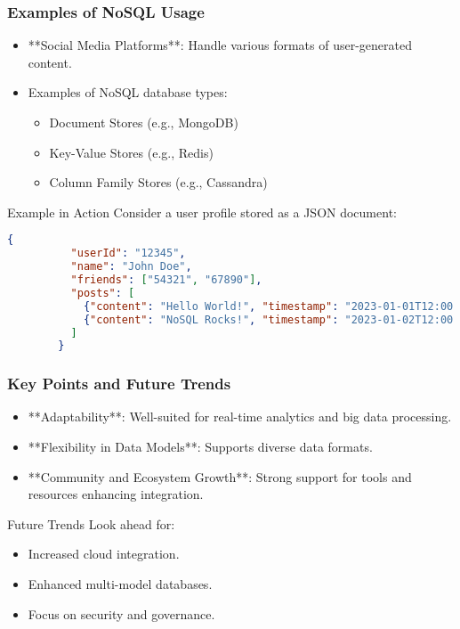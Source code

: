 \documentclass[aspectratio=169]{beamer}
\begin{document}
\begin{frame}[fragile]
    \frametitle{Examples of NoSQL Usage}
    \begin{itemize}
        \item **Social Media Platforms**: Handle various formats of user-generated content.
        \item Examples of NoSQL database types:
        \begin{itemize}
            \item Document Stores (e.g., MongoDB)
            \item Key-Value Stores (e.g., Redis)
            \item Column Family Stores (e.g., Cassandra)
        \end{itemize}
    \end{itemize}
    
    \begin{block}{Example in Action}
        Consider a user profile stored as a JSON document:
        \begin{lstlisting}[language=json]
        {
          "userId": "12345",
          "name": "John Doe",
          "friends": ["54321", "67890"],
          "posts": [
            {"content": "Hello World!", "timestamp": "2023-01-01T12:00:00Z"},
            {"content": "NoSQL Rocks!", "timestamp": "2023-01-02T12:00:00Z"}
          ]
        }
        \end{lstlisting}
    \end{block}
\end{frame}

\begin{frame}[fragile]
    \frametitle{Key Points and Future Trends}
    \begin{itemize}
        \item **Adaptability**: Well-suited for real-time analytics and big data processing.
        \item **Flexibility in Data Models**: Supports diverse data formats.
        \item **Community and Ecosystem Growth**: Strong support for tools and resources enhancing integration.
    \end{itemize}

    \begin{block}{Future Trends}
        Look ahead for:
        \begin{itemize}
            \item Increased cloud integration.
            \item Enhanced multi-model databases.
            \item Focus on security and governance.
        \end{itemize}
    \end{block}
\end{frame}
\end{document}

